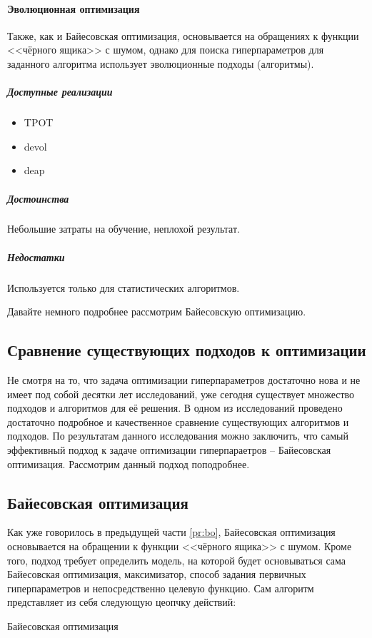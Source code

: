 \documentclass[times,specification,annotation]{itmo-student-thesis}
\begin{document}
	\paragraph{Эволюционная оптимизация} Также, как и Байесовская оптимизация, основывается на обращениях к функции <<чёрного ящика>> с шумом, однако для поиска гиперпараметров для заданного алгоритма использует эволюционные подходы (алгоритмы)\cite{NIPS2011_4443}.
		\subparagraph{Доступные реализации}
		\begin{itemize}
			\item TPOT
			\item devol
			\item deap
		\end{itemize}
		\subparagraph{Достоинства} Небольшие затраты на обучение, неплохой результат.
		\subparagraph{Недостатки} Используется только для статистических алгоритмов. 
		
	Давайте немного подробнее рассмотрим Байесовскую оптимизацию.
	
	\subsection{Сравнение существующих подходов к оптимизации} \label{ss:comparison}
	Не смотря на то, что задача оптимизации гиперпараметров достаточно нова и не имеет под собой десятки лет исследований, уже сегодня существует множество подходов и алгоритмов для её решения. В одном из исследований\cite{yu2020hyperparameter} проведено достаточно подробное и качественное сравнение существующих алгоритмов и подходов. По результатам данного исследования можно заключить, что самый эффективный подход к задаче оптимизации гиперпараетров -- Байесовская оптимизация. Рассмотрим данный подход поподробнее.
	
	\subsection{Байесовская оптимизация} \label{ss:bo}
	Как уже говорилось в предыдущей части \ref{pr:bo}, Байесовская оптимизация основывается на обращении к функции <<чёрного ящика>> с шумом. Кроме того, подход требует определить модель, на которой будет основываться сама Байесовская оптимизация, максимизатор, способ задания первичных гиперпараметров и непосредственно целевую функцию. Сам алгоритм представляет из себя следующую цеопчку действий:
	
	\begin{algorithm}[!ht]
		\caption{Байесовская оптимизация}\label{alg:bo}
		\begin{algorithmic}
			\EndFor
		\end{algorithmic}
	\end{algorithm}
\end{document}

